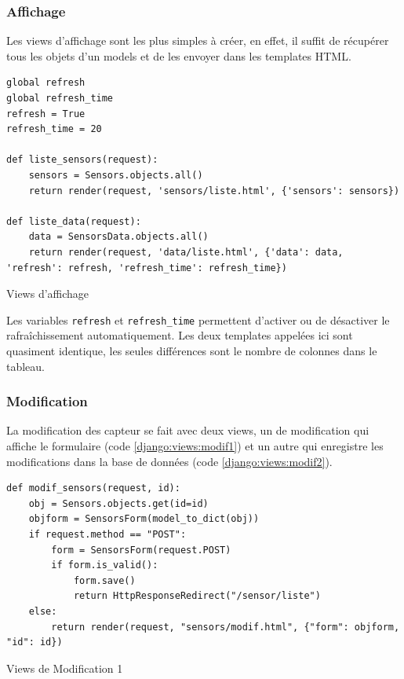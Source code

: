 \documentclass{article}
\begin{document}
\subsubsection{Affichage}
Les views d'affichage sont les plus simples à créer, en effet, il suffit de récupérer tous les objets d'un models et de les envoyer dans les templates HTML.
\begin{listing}[H]
    \begin{verbatim}
global refresh
global refresh_time
refresh = True
refresh_time = 20

def liste_sensors(request):
    sensors = Sensors.objects.all()
    return render(request, 'sensors/liste.html', {'sensors': sensors})

def liste_data(request):
    data = SensorsData.objects.all()
    return render(request, 'data/liste.html', {'data': data, 'refresh': refresh, 'refresh_time': refresh_time})
    \end{verbatim}
    \caption{Views d'affichage}
    \label{django:views:affichage}
\end{listing}
Les variables \verb|refresh| et \verb|refresh_time| permettent d'activer ou de désactiver le rafraîchissement automatiquement. 
Les deux templates appelées ici sont quasiment identique, les seules différences sont le nombre de colonnes dans le tableau.

\subsubsection{Modification}
La modification des capteur se fait avec deux views, un de modification qui affiche le formulaire (code \ref{django:views:modif1}) et un autre qui enregistre les modifications dans la base de données (code \ref{django:views:modif2}).
\begin{listing}[H]
    \begin{verbatim}
def modif_sensors(request, id):
    obj = Sensors.objects.get(id=id)
    objform = SensorsForm(model_to_dict(obj))
    if request.method == "POST":
        form = SensorsForm(request.POST)
        if form.is_valid():
            form.save()
            return HttpResponseRedirect("/sensor/liste")
    else:
        return render(request, "sensors/modif.html", {"form": objform, "id": id})
    \end{verbatim}
    \caption{Views de Modification 1}
    \label{django:views:modif1}
\end{listing}
\end{document}
